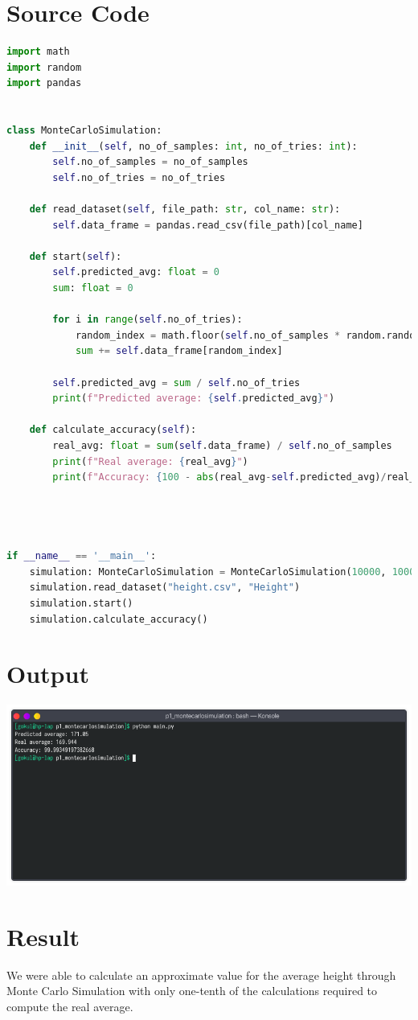\documentclass{article}
\begin{document}
\section{Source Code}
\small
\begin{lstlisting}[language=Python]
import math
import random
import pandas


class MonteCarloSimulation:
    def __init__(self, no_of_samples: int, no_of_tries: int):
        self.no_of_samples = no_of_samples
        self.no_of_tries = no_of_tries
    
    def read_dataset(self, file_path: str, col_name: str):
        self.data_frame = pandas.read_csv(file_path)[col_name]
    
    def start(self):
        self.predicted_avg: float = 0
        sum: float = 0
        
        for i in range(self.no_of_tries):
            random_index = math.floor(self.no_of_samples * random.random())
            sum += self.data_frame[random_index]
        
        self.predicted_avg = sum / self.no_of_tries
        print(f"Predicted average: {self.predicted_avg}")
    
    def calculate_accuracy(self):
        real_avg: float = sum(self.data_frame) / self.no_of_samples
        print(f"Real average: {real_avg}")
        print(f"Accuracy: {100 - abs(real_avg-self.predicted_avg)/real_avg}")


    

if __name__ == '__main__':
    simulation: MonteCarloSimulation = MonteCarloSimulation(10000, 1000)
    simulation.read_dataset("height.csv", "Height")
    simulation.start()
    simulation.calculate_accuracy()
\end{lstlisting}

\section{Output}
\includegraphics[width=\textwidth]{img/ss.png}
\section{Result}
\large
We were able to calculate an approximate value for the average height
through Monte Carlo Simulation with only one-tenth of the calculations 
required to compute the real average.
\end{document}
